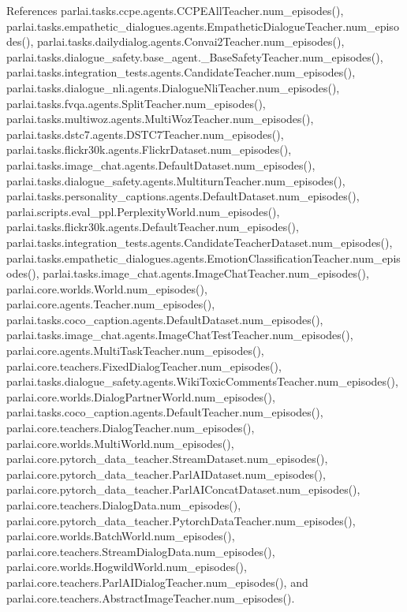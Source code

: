 References parlai.\+tasks.\+ccpe.\+agents.\+C\+C\+P\+E\+All\+Teacher.\+num\+\_\+episodes(), parlai.\+tasks.\+empathetic\+\_\+dialogues.\+agents.\+Empathetic\+Dialogue\+Teacher.\+num\+\_\+episodes(), parlai.\+tasks.\+dailydialog.\+agents.\+Convai2\+Teacher.\+num\+\_\+episodes(), parlai.\+tasks.\+dialogue\+\_\+safety.\+base\+\_\+agent.\+\_\+\+Base\+Safety\+Teacher.\+num\+\_\+episodes(), parlai.\+tasks.\+integration\+\_\+tests.\+agents.\+Candidate\+Teacher.\+num\+\_\+episodes(), parlai.\+tasks.\+dialogue\+\_\+nli.\+agents.\+Dialogue\+Nli\+Teacher.\+num\+\_\+episodes(), parlai.\+tasks.\+fvqa.\+agents.\+Split\+Teacher.\+num\+\_\+episodes(), parlai.\+tasks.\+multiwoz.\+agents.\+Multi\+Woz\+Teacher.\+num\+\_\+episodes(), parlai.\+tasks.\+dstc7.\+agents.\+D\+S\+T\+C7\+Teacher.\+num\+\_\+episodes(), parlai.\+tasks.\+flickr30k.\+agents.\+Flickr\+Dataset.\+num\+\_\+episodes(), parlai.\+tasks.\+image\+\_\+chat.\+agents.\+Default\+Dataset.\+num\+\_\+episodes(), parlai.\+tasks.\+dialogue\+\_\+safety.\+agents.\+Multiturn\+Teacher.\+num\+\_\+episodes(), parlai.\+tasks.\+personality\+\_\+captions.\+agents.\+Default\+Dataset.\+num\+\_\+episodes(), parlai.\+scripts.\+eval\+\_\+ppl.\+Perplexity\+World.\+num\+\_\+episodes(), parlai.\+tasks.\+flickr30k.\+agents.\+Default\+Teacher.\+num\+\_\+episodes(), parlai.\+tasks.\+integration\+\_\+tests.\+agents.\+Candidate\+Teacher\+Dataset.\+num\+\_\+episodes(), parlai.\+tasks.\+empathetic\+\_\+dialogues.\+agents.\+Emotion\+Classification\+Teacher.\+num\+\_\+episodes(), parlai.\+tasks.\+image\+\_\+chat.\+agents.\+Image\+Chat\+Teacher.\+num\+\_\+episodes(), parlai.\+core.\+worlds.\+World.\+num\+\_\+episodes(), parlai.\+core.\+agents.\+Teacher.\+num\+\_\+episodes(), parlai.\+tasks.\+coco\+\_\+caption.\+agents.\+Default\+Dataset.\+num\+\_\+episodes(), parlai.\+tasks.\+image\+\_\+chat.\+agents.\+Image\+Chat\+Test\+Teacher.\+num\+\_\+episodes(), parlai.\+core.\+agents.\+Multi\+Task\+Teacher.\+num\+\_\+episodes(), parlai.\+core.\+teachers.\+Fixed\+Dialog\+Teacher.\+num\+\_\+episodes(), parlai.\+tasks.\+dialogue\+\_\+safety.\+agents.\+Wiki\+Toxic\+Comments\+Teacher.\+num\+\_\+episodes(), parlai.\+core.\+worlds.\+Dialog\+Partner\+World.\+num\+\_\+episodes(), parlai.\+tasks.\+coco\+\_\+caption.\+agents.\+Default\+Teacher.\+num\+\_\+episodes(), parlai.\+core.\+teachers.\+Dialog\+Teacher.\+num\+\_\+episodes(), parlai.\+core.\+worlds.\+Multi\+World.\+num\+\_\+episodes(), parlai.\+core.\+pytorch\+\_\+data\+\_\+teacher.\+Stream\+Dataset.\+num\+\_\+episodes(), parlai.\+core.\+pytorch\+\_\+data\+\_\+teacher.\+Parl\+A\+I\+Dataset.\+num\+\_\+episodes(), parlai.\+core.\+pytorch\+\_\+data\+\_\+teacher.\+Parl\+A\+I\+Concat\+Dataset.\+num\+\_\+episodes(), parlai.\+core.\+teachers.\+Dialog\+Data.\+num\+\_\+episodes(), parlai.\+core.\+pytorch\+\_\+data\+\_\+teacher.\+Pytorch\+Data\+Teacher.\+num\+\_\+episodes(), parlai.\+core.\+worlds.\+Batch\+World.\+num\+\_\+episodes(), parlai.\+core.\+teachers.\+Stream\+Dialog\+Data.\+num\+\_\+episodes(), parlai.\+core.\+worlds.\+Hogwild\+World.\+num\+\_\+episodes(), parlai.\+core.\+teachers.\+Parl\+A\+I\+Dialog\+Teacher.\+num\+\_\+episodes(), and parlai.\+core.\+teachers.\+Abstract\+Image\+Teacher.\+num\+\_\+episodes().

